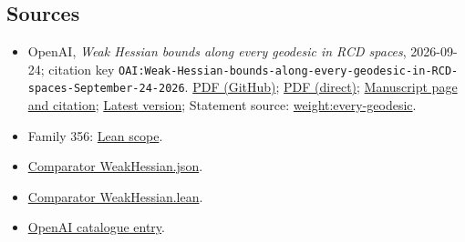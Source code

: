 \documentclass[11pt]{article}
\begin{document}
\subsection{Sources}
\begin{itemize}
\item OpenAI, \emph{Weak Hessian bounds along every geodesic in RCD spaces}, 2026-09-24; citation key \texttt{OAI:Weak-Hessian-bounds-along-every-geodesic-in-RCD-spaces-September-24-2026}. \href{https://github.com/openai/math/blob/adc7f1241b42e322a6451854ab7e4b4c146bf78a/preprints/Weak-Hessian-bounds-along-every-geodesic-in-RCD-spaces-September-24-2026/weak-hessian-geodesics.pdf}{PDF (GitHub)}; \href{https://github.com/openai/math/raw/adc7f1241b42e322a6451854ab7e4b4c146bf78a/preprints/Weak-Hessian-bounds-along-every-geodesic-in-RCD-spaces-September-24-2026/weak-hessian-geodesics.pdf}{PDF (direct)}; \href{https://github.com/openai/math/blob/adc7f1241b42e322a6451854ab7e4b4c146bf78a/preprints/Weak-Hessian-bounds-along-every-geodesic-in-RCD-spaces-September-24-2026/README.md}{Manuscript page and citation}; \href{https://github.com/openai/math/blob/main/preprints/Weak-Hessian-bounds-along-every-geodesic-in-RCD-spaces-September-24-2026/weak-hessian-geodesics.pdf}{Latest version}; Statement source: \href{https://github.com/openai/math/blob/adc7f1241b42e322a6451854ab7e4b4c146bf78a/preprints/Weak-Hessian-bounds-along-every-geodesic-in-RCD-spaces-September-24-2026/build/sections/introduction.tex\#L52}{weight:every-geodesic}.
\item Family 356: \href{https://github.com/openai/math/blob/adc7f1241b42e322a6451854ab7e4b4c146bf78a/lean/docs/356.md}{Lean scope}.
\item \href{https://github.com/openai/math/blob/adc7f1241b42e322a6451854ab7e4b4c146bf78a/lean/ComparatorChallenges/WeakHessian.json}{Comparator WeakHessian.json}.
\item \href{https://github.com/openai/math/blob/adc7f1241b42e322a6451854ab7e4b4c146bf78a/lean/ComparatorChallenges/WeakHessian.lean}{Comparator WeakHessian.lean}.
\item \href{https://github.com/openai/math/blob/adc7f1241b42e322a6451854ab7e4b4c146bf78a/CONTENTS.md}{OpenAI catalogue entry}.
\end{itemize}
\end{document}
